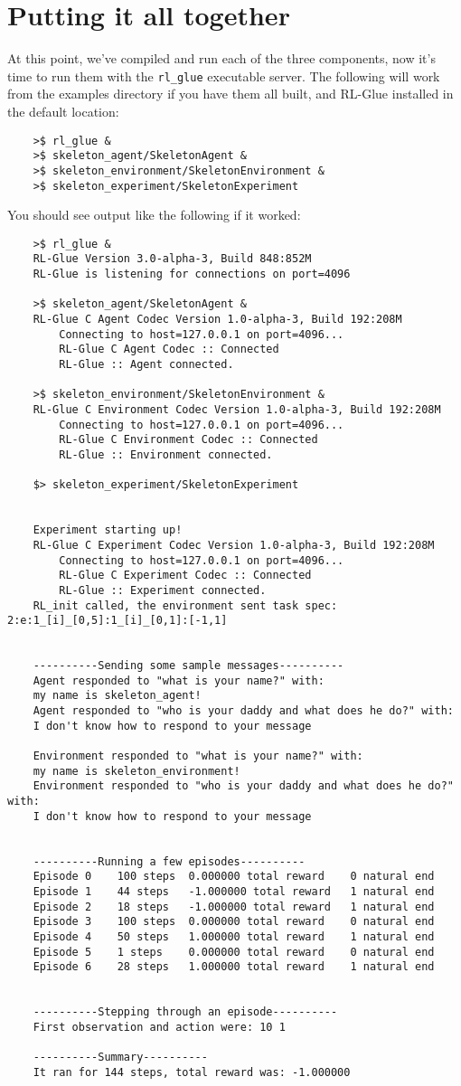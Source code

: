 \documentclass[11pt]{article}
\begin{document}
\section{Putting it all together}
At this point, we've compiled and run each of the three components, now it's time to run them with the \texttt{rl\_glue} executable server.  The following will work from the examples directory if you have them all built, and RL-Glue installed in the default location:
\begin{verbatim}
	>$ rl_glue &
	>$ skeleton_agent/SkeletonAgent &
	>$ skeleton_environment/SkeletonEnvironment &
	>$ skeleton_experiment/SkeletonExperiment	
\end{verbatim}

You should see output like the following if it worked:
\begin{verbatim}
	>$ rl_glue &
	RL-Glue Version 3.0-alpha-3, Build 848:852M
	RL-Glue is listening for connections on port=4096

	>$ skeleton_agent/SkeletonAgent & 
	RL-Glue C Agent Codec Version 1.0-alpha-3, Build 192:208M
		Connecting to host=127.0.0.1 on port=4096...
		RL-Glue C Agent Codec :: Connected
		RL-Glue :: Agent connected.

	>$ skeleton_environment/SkeletonEnvironment & 
	RL-Glue C Environment Codec Version 1.0-alpha-3, Build 192:208M
		Connecting to host=127.0.0.1 on port=4096...
		RL-Glue C Environment Codec :: Connected
		RL-Glue :: Environment connected.

	$> skeleton_experiment/SkeletonExperiment


	Experiment starting up!
	RL-Glue C Experiment Codec Version 1.0-alpha-3, Build 192:208M
		Connecting to host=127.0.0.1 on port=4096...
		RL-Glue C Experiment Codec :: Connected
		RL-Glue :: Experiment connected.
	RL_init called, the environment sent task spec: 2:e:1_[i]_[0,5]:1_[i]_[0,1]:[-1,1]


	----------Sending some sample messages----------
	Agent responded to "what is your name?" with: 
	my name is skeleton_agent!
	Agent responded to "who is your daddy and what does he do?" with: 
	I don't know how to respond to your message

	Environment responded to "what is your name?" with: 
	my name is skeleton_environment!
	Environment responded to "who is your daddy and what does he do?" with: 
	I don't know how to respond to your message


	----------Running a few episodes----------
	Episode 0	 100 steps 	0.000000 total reward	 0 natural end 
	Episode 1	 44 steps 	-1.000000 total reward	 1 natural end 
	Episode 2	 18 steps 	-1.000000 total reward	 1 natural end 
	Episode 3	 100 steps 	0.000000 total reward	 0 natural end 
	Episode 4	 50 steps 	1.000000 total reward	 1 natural end 
	Episode 5	 1 steps 	0.000000 total reward	 0 natural end 
	Episode 6	 28 steps 	1.000000 total reward	 1 natural end 


	----------Stepping through an episode----------
	First observation and action were: 10 1

	----------Summary----------
	It ran for 144 steps, total reward was: -1.000000
	
\end{verbatim}
\end{document}

